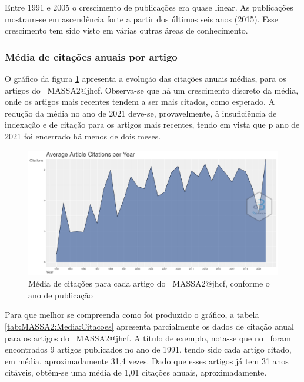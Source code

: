 Entre 1991 e 2005 o crescimento de publicações era quase linear. As publicações mostram-se em ascendência forte a partir dos últimos seis anos (2015). Esse crescimento tem sido visto em várias outras áreas de conhecimento.

\subsubsection{Média de citações anuais por artigo}

O gráfico da figura \ref{fig:MASSA2:Media:Citacoes} apresenta a evolução das citações anuais médias, para os artigos do \dataset\ MASSA2@jhcf. Observa-se que há um crescimento discreto da média, onde os artigos mais recentes tendem a ser mais citados, como esperado. A redução da média no ano de 2021 deve-se, provavelmente, à insuficiência de indexação e de citação para os artigos mais recentes, tendo em vista que p ano de 2021 foi encerrado há menos de dois meses. 

\begin{figure}
    \centering
    \includegraphics[width=1\textwidth]{experiments/jhcf/PesqBibliogr/SimulacaoMultiagente/WoS-20220203/Descritiva/MASSA2-Average-Citations-per-Year.png}
    \caption{Média de citações para cada artigo do \dataset\ MASSA2@jhcf, conforme o ano de publicação}
    \label{fig:MASSA2:Media:Citacoes}
\end{figure}

Para que melhor se compreenda como foi produzido o gráfico, a tabela \ref{tab:MASSA2:Media:Citacoes} apresenta parcialmente os dados de citação anual para os artigos do \dataset\ MASSA2@jhcf. A título de exemplo, nota-se que no \dataset\ foram encontrados 9 artigos publicados no ano de 1991, tendo sido cada artigo citado, em média, aproximadamente 31,4 vezes. Dado que esses artigos já tem 31 anos citáveis, obtém-se uma média de 1,01 citações anuais, aproximadamente.


